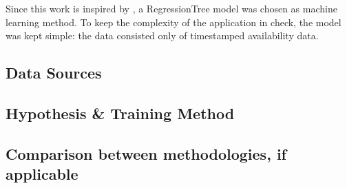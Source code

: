 Since this work is inspired by \cite{parkendd}, a RegressionTree model was chosen as machine learning method. To keep the complexity of the application in check, the model was kept simple: the data consisted only of timestamped availability data.

\subsection{Data Sources}\label{data sources}


\subsection{Hypothesis \& Training Method}\label{sec:training_model}



\subsection{Comparison between methodologies, if applicable}
